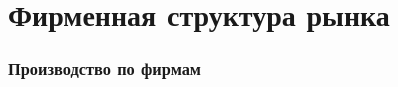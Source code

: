 \section{Фирменная структура рынка}

\begin{frame}
    \frametitle{Производство по фирмам}
    \begin{center}
        
    \end{center}
\end{frame}